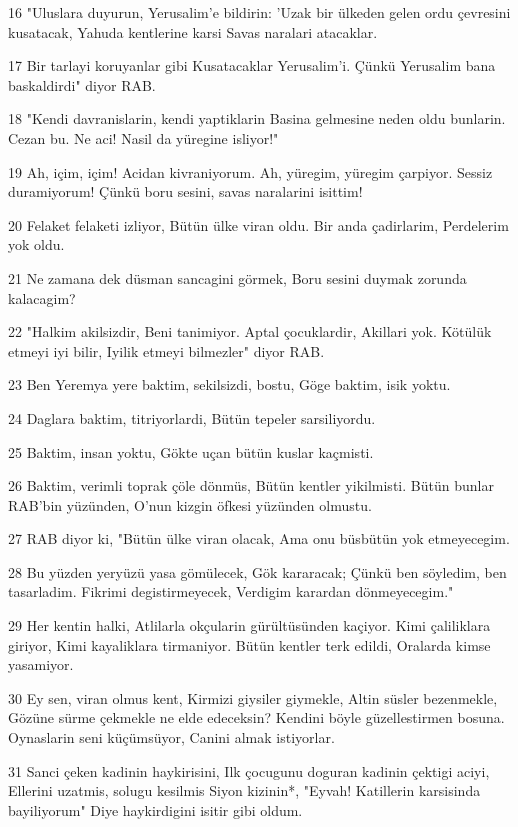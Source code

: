 \par 16 "Uluslara duyurun, Yerusalim'e bildirin: 'Uzak bir ülkeden gelen ordu çevresini kusatacak, Yahuda kentlerine karsi Savas naralari atacaklar.
\par 17 Bir tarlayi koruyanlar gibi Kusatacaklar Yerusalim'i. Çünkü Yerusalim bana baskaldirdi" diyor RAB.
\par 18 "Kendi davranislarin, kendi yaptiklarin Basina gelmesine neden oldu bunlarin. Cezan bu. Ne aci! Nasil da yüregine isliyor!"
\par 19 Ah, içim, içim! Acidan kivraniyorum. Ah, yüregim, yüregim çarpiyor. Sessiz duramiyorum! Çünkü boru sesini, savas naralarini isittim!
\par 20 Felaket felaketi izliyor, Bütün ülke viran oldu. Bir anda çadirlarim, Perdelerim yok oldu.
\par 21 Ne zamana dek düsman sancagini görmek, Boru sesini duymak zorunda kalacagim?
\par 22 "Halkim akilsizdir, Beni tanimiyor. Aptal çocuklardir, Akillari yok. Kötülük etmeyi iyi bilir, Iyilik etmeyi bilmezler" diyor RAB.
\par 23 Ben Yeremya yere baktim, sekilsizdi, bostu, Göge baktim, isik yoktu.
\par 24 Daglara baktim, titriyorlardi, Bütün tepeler sarsiliyordu.
\par 25 Baktim, insan yoktu, Gökte uçan bütün kuslar kaçmisti.
\par 26 Baktim, verimli toprak çöle dönmüs, Bütün kentler yikilmisti. Bütün bunlar RAB'bin yüzünden, O'nun kizgin öfkesi yüzünden olmustu.
\par 27 RAB diyor ki, "Bütün ülke viran olacak, Ama onu büsbütün yok etmeyecegim.
\par 28 Bu yüzden yeryüzü yasa gömülecek, Gök kararacak; Çünkü ben söyledim, ben tasarladim. Fikrimi degistirmeyecek, Verdigim karardan dönmeyecegim."
\par 29 Her kentin halki, Atlilarla okçularin gürültüsünden kaçiyor. Kimi çaliliklara giriyor, Kimi kayaliklara tirmaniyor. Bütün kentler terk edildi, Oralarda kimse yasamiyor.
\par 30 Ey sen, viran olmus kent, Kirmizi giysiler giymekle, Altin süsler bezenmekle, Gözüne sürme çekmekle ne elde edeceksin? Kendini böyle güzellestirmen bosuna. Oynaslarin seni küçümsüyor, Canini almak istiyorlar.
\par 31 Sanci çeken kadinin haykirisini, Ilk çocugunu doguran kadinin çektigi aciyi, Ellerini uzatmis, solugu kesilmis Siyon kizinin*, "Eyvah! Katillerin karsisinda bayiliyorum" Diye haykirdigini isitir gibi oldum.

